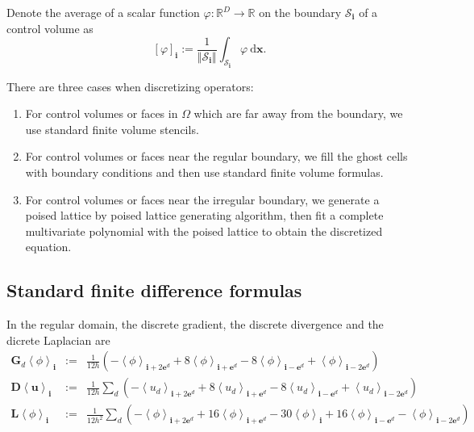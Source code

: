 \begin{defn}
  Denote the average of a scalar function
  $\varphi:\mathbb{R}^D\rightarrow\mathbb{R}$ on the boundary
  $\mathcal{S}_{\mathbf{i}}$ of a control volume as
  \begin{equation}
    \left[\varphi\right]_{\mathbf{i}} := \frac{1}{\Vert
      \mathcal{S}_{\mathbf{i}}\Vert}\int_{\mathcal{S}_{\mathbf{i}}}
    \varphi\  \mathrm{d}\mathbf{x}.
  \end{equation}
\end{defn}


There are three cases when discretizing operators:
\begin{enumerate}
\item For control volumes or faces in $\Omega$ which are far away
  from the boundary, we use standard finite volume stencils.
\item For control volumes or faces near the regular boundary, we
  fill the ghost cells with boundary conditions and then use standard
  finite volume formulas.
\item For control volumes or faces near the irregular boundary, we
  generate a poised lattice by poised lattice
  generating algorithm, then fit a complete
  multivariate polynomial with the poised lattice to obtain the
  discretized equation.
\end{enumerate}

\subsection{Standard finite difference formulas}
\label{sec:Standard}

In the regular domain, the discrete gradient, the discrete divergence and the dicrete
Laplacian are
\begin{eqnarray}
  \label{eq:G}
  \mathbf{G}_d\left<\phi\right>_{\mathbf{i}} &:=&
  \frac{1}{12h}\left(-\left<\phi\right>_{\mathbf{i}+2\mathbf{e}^d}
    +8\left<\phi\right>_{\mathbf{i}+\mathbf{e}^d}
    -8\left<\phi\right>_{\mathbf{i}-\mathbf{e}^d} 
  +\left<\phi\right>_{\mathbf{i}-2\mathbf{e}^d}\right) \\
  \label{eq:D}
  \mathbf{D}\left<\mathbf{u}\right>_{\mathbf{i}} &:=&
  \frac{1}{12h}\sum\limits_d \left( -\left<u_d\right>_{\mathbf{i}+2\mathbf{e}^d}
    +8\left<u_d\right>_{\mathbf{i}+\mathbf{e}^d}
    -8\left<u_d\right>_{\mathbf{i}-\mathbf{e}^d} 
                                                      +\left<u_d\right>_{\mathbf{i}-2\mathbf{e}^d}\right) \\
  \label{eq:L}
  \mathbf{L}\left<\phi\right>_{\mathbf{i}} &:=&
  \frac{1}{12h^2}\sum\limits_d\left(-\left<\phi\right>_{\mathbf{i}+2\mathbf{e}^d}
    +16\left<\phi\right>_{\mathbf{i}+\mathbf{e}^d} - 30\left<\phi\right>_{\mathbf{i}} 
    +16\left<\phi\right>_{\mathbf{i}-\mathbf{e}^d} 
  -\left<\phi\right>_{\mathbf{i}-2\mathbf{e}^d}\right) \\
\end{eqnarray}

